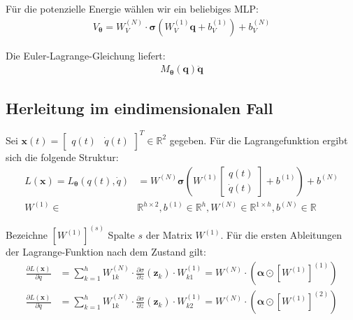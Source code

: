 \documentclass[a4paper, 12pt]{scrartcl}
\begin{document}
Für die potenzielle Energie wählen wir ein beliebiges MLP: 
%
\begin{align}\label{def:NN_V}
    V_{\bm{\theta}}
    =
    W^{(N)}_V \cdot \bm{\sigma}\left(W^{(1)}_V \bm{q} + b^{(1)}_V\right) + b^{(N)}_V
\end{align}

Die Euler-Lagrange-Gleichung liefert:
%
\begin{align*}
    M_{\bm{\theta}}(\bm{q}) \bm{\ddot{q}} 
\end{align*}


\subsection{Herleitung im eindimensionalen Fall}

Sei $\bm{x}(t) = \begin{bmatrix} q(t) & \dot{q}(t) \end{bmatrix}^T \in \mathbb{R}^2$ gegeben. 
Für die Lagrangefunktion ergibt sich die folgende Struktur:
\begin{align*}
    L(\bm{x})
    =
    L_{\bm{\theta}}(q(t), \dot{q}) 
    &= 
    W^{(N)} 
    \bm{\sigma}
    \left(
        W^{(1)} 
        \begin{bmatrix} 
            q(t) \\
            \dot{q}(t)
        \end{bmatrix}
        + 
        b^{(1)}
    \right)
    + b^{(N)}
    \\
    W^{(1)} \in & \mathbb{R}^{h \times 2}, b^{(1)} \in \mathbb{R}^{h}, W^{(N)} \in \mathbb{R}^{1 \times h},
    b^{(N)} \in \mathbb{R}
\end{align*}


Bezeichne $\left[W^{(1)}\right]^{(s)}$ Spalte $s$ der Matrix $W^{(1)}$.
Für die ersten Ableitungen der Lagrange-Funktion nach dem Zustand gilt:
\begin{align*}
    \frac{\partial L(\bm{x})}{\partial q}
    &=
    \sum_{k=1}^{h}
    W^{(N)}_{1k} 
    \cdot 
    \frac{\partial \sigma}{\partial z} \left(\bm{z}_k\right)
    \cdot 
    W^{(1)}_{k1} 
    =
    W^{(N)} \cdot 
    \left(
        \bm{\alpha} \odot \left[W^{(1)}\right]^{(1)}
    \right)
    \\
    \frac{\partial L(\bm{x})}{\partial \dot{q}}
    &=
    \sum_{k=1}^{h}
    W^{(N)}_{1k}
    \cdot 
    \frac{\partial \sigma}{\partial z} (\bm{z}_k)
    \cdot 
    W^{(1)}_{k2}
    =
    W^{(N)} \cdot 
    \left(
        \bm{\alpha} \odot \left[W^{(1)}\right]^{(2)}
    \right)
\end{align*}
\end{document}
